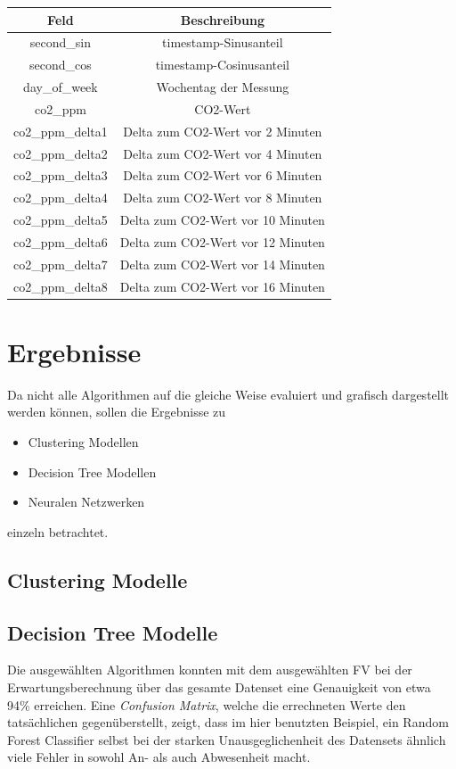 \begin{center}
    \begin{tabular}{ |c||c| } 
     \hline
     Feld & Beschreibung \\ 
     \hline\hline
     second\_sin & timestamp-Sinusanteil\\
     second\_cos & timestamp-Cosinusanteil\\
     day\_of\_week & Wochentag der Messung\\
     co2\_ppm & CO2-Wert\\ 
     co2\_ppm\_delta1 & Delta zum CO2-Wert vor 2 Minuten\\ 
     co2\_ppm\_delta2 & Delta zum CO2-Wert vor 4 Minuten\\ 
     co2\_ppm\_delta3 & Delta zum CO2-Wert vor 6 Minuten\\ 
     co2\_ppm\_delta4 & Delta zum CO2-Wert vor 8 Minuten\\ 
     co2\_ppm\_delta5 & Delta zum CO2-Wert vor 10 Minuten\\ 
     co2\_ppm\_delta6 & Delta zum CO2-Wert vor 12 Minuten\\ 
     co2\_ppm\_delta7 & Delta zum CO2-Wert vor 14 Minuten\\ 
     co2\_ppm\_delta8 & Delta zum CO2-Wert vor 16 Minuten\\ 
     \hline
    \end{tabular}
\end{center}

\newpage
\section{Ergebnisse}
Da nicht alle Algorithmen auf die gleiche Weise evaluiert und grafisch dargestellt werden können, sollen 
die Ergebnisse zu 
\begin{itemize}
    \item Clustering Modellen
    \item Decision Tree Modellen
    \item Neuralen Netzwerken
\end{itemize}
einzeln betrachtet.

\subsection{Clustering Modelle}

\subsection{Decision Tree Modelle}
Die ausgewählten Algorithmen konnten mit dem ausgewählten FV bei der Erwartungsberechnung über das gesamte 
Datenset eine Genauigkeit von etwa 94\% erreichen. Eine \textit{Confusion Matrix}, welche die errechneten 
Werte den tatsächlichen gegenüberstellt, zeigt, dass im hier benutzten Beispiel, ein Random Forest Classifier 
selbst bei der starken Unausgeglichenheit des Datensets ähnlich viele Fehler in sowohl An- als auch Abwesenheit 
macht.

